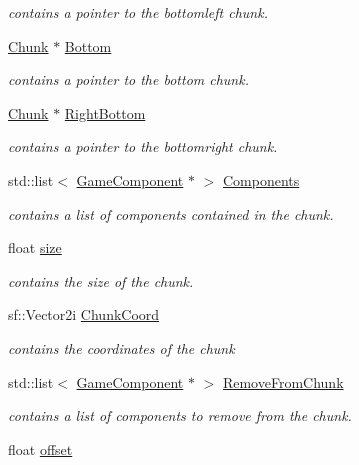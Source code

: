 \begin{DoxyCompactItemize}
\begin{DoxyCompactList}\small\item\em contains a pointer to the bottomleft chunk. \end{DoxyCompactList}\item 
\hyperlink{class_chunk}{Chunk} $\ast$ \hyperlink{class_chunk_ac9ac53a727ae045b6f751ec6a68bcaca}{Bottom}
\begin{DoxyCompactList}\small\item\em contains a pointer to the bottom chunk. \end{DoxyCompactList}\item 
\hyperlink{class_chunk}{Chunk} $\ast$ \hyperlink{class_chunk_afded01a9a67540c9f64dde5776021f4b}{Right\-Bottom}
\begin{DoxyCompactList}\small\item\em contains a pointer to the bottomright chunk. \end{DoxyCompactList}\item 
std\-::list$<$ \hyperlink{class_game_component}{Game\-Component} $\ast$ $>$ \hyperlink{class_chunk_a4cdf6febd96ff99b681e37d548617a38}{Components}
\begin{DoxyCompactList}\small\item\em contains a list of components contained in the chunk. \end{DoxyCompactList}\item 
float \hyperlink{class_chunk_af46410b580baf2985b01044d5c041b2e}{size}
\begin{DoxyCompactList}\small\item\em contains the size of the chunk. \end{DoxyCompactList}\item 
sf\-::\-Vector2i \hyperlink{class_chunk_abb5b1842148b3d7c616065766bfd2b33}{Chunk\-Coord}
\begin{DoxyCompactList}\small\item\em contains the coordinates of the chunk \end{DoxyCompactList}\item 
std\-::list$<$ \hyperlink{class_game_component}{Game\-Component} $\ast$ $>$ \hyperlink{class_chunk_adf6692fdab4518524e217cc0ef09d282}{Remove\-From\-Chunk}
\begin{DoxyCompactList}\small\item\em contains a list of components to remove from the chunk. \end{DoxyCompactList}\item 
float \hyperlink{class_chunk_a6ab7f8f3970c886a62ccc1630bc60a16}{offset}
\end{DoxyCompactItemize}


